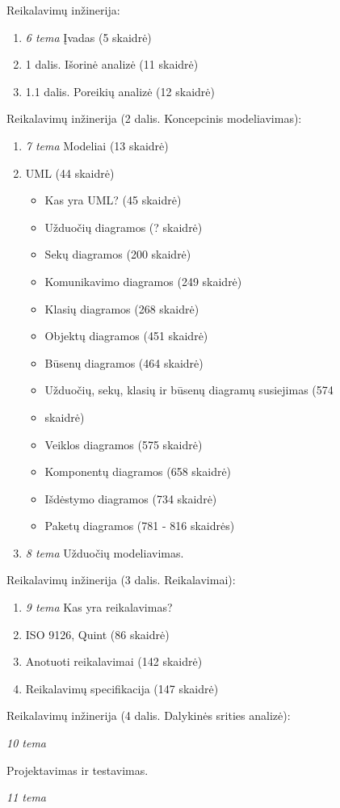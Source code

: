 Reikalavimų inžinerija:

\begin{enumerate}
  \item \emph{6 tema} Įvadas (5 skaidrė)
  \item 1 dalis. Išorinė analizė (11 skaidrė)
  \item 1.1 dalis. Poreikių analizė (12 skaidrė)
\end{enumerate}

Reikalavimų inžinerija (2 dalis. Koncepcinis modeliavimas):

\begin{enumerate}
  \item \emph{7 tema} Modeliai (13 skaidrė)
  \item UML (44 skaidrė)
    \begin{itemize}
      \item Kas yra UML? (45 skaidrė)
      \item Užduočių diagramos (? skaidrė)
      \item Sekų diagramos (200 skaidrė)
      \item Komunikavimo diagramos (249 skaidrė)
      \item Klasių diagramos (268 skaidrė)
      \item Objektų diagramos (451 skaidrė)
      \item Būsenų diagramos (464 skaidrė)
      \item Užduočių, sekų, klasių ir būsenų diagramų susiejimas (574 
      \item skaidrė)
      \item Veiklos diagramos (575 skaidrė)
      \item Komponentų diagramos (658 skaidrė)
      \item Išdėstymo diagramos (734 skaidrė)
      \item Paketų diagramos (781 - 816 skaidrės)
    \end{itemize}
  \item \emph{8 tema} Užduočių modeliavimas.
\end{enumerate}

Reikalavimų  inžinerija (3 dalis. Reikalavimai):

\begin{enumerate}
  \item \emph{9 tema} Kas yra reikalavimas?
  \item ISO 9126, Quint (86 skaidrė)
  \item Anotuoti reikalavimai (142 skaidrė)
  \item Reikalavimų specifikacija (147 skaidrė)
\end{enumerate}

Reikalavimų  inžinerija (4 dalis. Dalykinės srities analizė):

\emph{10 tema}

Projektavimas ir testavimas.

\emph{11 tema}
